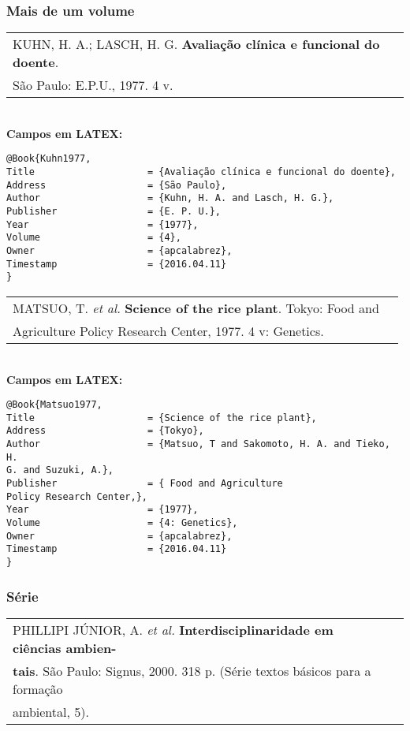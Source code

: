 \subsubsection{Mais de um volume}

\begin{tabular}{|l|c|} \hline
	KUHN, H. A.; LASCH, H. G. \textbf{Avaliação clínica e funcional do doente}. \\São Paulo:  E.P.U., 1977. 4 v.    \\\hline
\end{tabular}\\

\textbf{Campos em LATEX:}

\begin{verbatim}
@Book{Kuhn1977,
Title                    = {Avaliação clínica e funcional do doente},
Address                  = {São Paulo},
Author                   = {Kuhn, H. A. and Lasch, H. G.},
Publisher                = {E. P. U.},
Year                     = {1977},
Volume                   = {4},
Owner                    = {apcalabrez},
Timestamp                = {2016.04.11}
}
\end{verbatim}

\begin{tabular}{|l|c|} \hline
	MATSUO, T. \textit{et al.}  \textbf{ Science of the rice plant}. Tokyo: Food and \\ Agriculture Policy Research Center, 1977. 4 v: Genetics. \\\hline
\end{tabular}\\

\textbf{Campos em LATEX:}

\begin{verbatim}
@Book{Matsuo1977,
Title                    = {Science of the rice plant},
Address                  = {Tokyo},
Author                   = {Matsuo, T and Sakomoto, H. A. and Tieko, H. 
G. and Suzuki, A.},
Publisher                = { Food and Agriculture
Policy Research Center,},
Year                     = {1977},
Volume                   = {4: Genetics},
Owner                    = {apcalabrez},
Timestamp                = {2016.04.11}
}
\end{verbatim}

\subsubsection{S\'erie}

\begin{tabular}{|l|c|} \hline
	PHILLIPI JÚNIOR, A. \textit{et al.} \textbf{Interdisciplinaridade em ci\^encias ambien-}\\ 
	\textbf{tais}. São Paulo: Signus, 2000. 318 p. (S\'erie textos b\'asicos para a formação \\ambiental, 5). \\\hline
\end{tabular}\\

